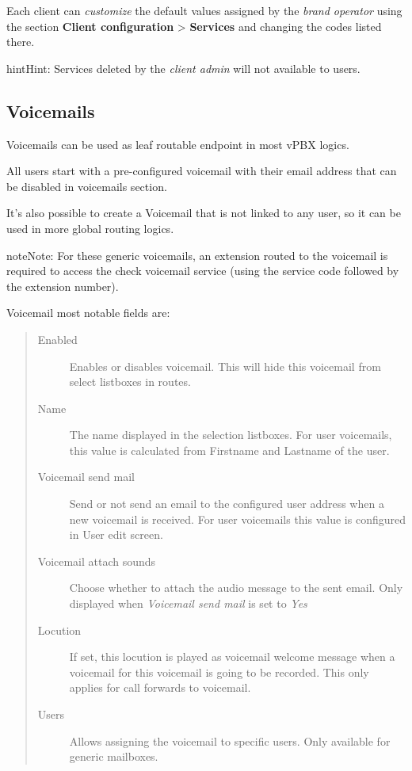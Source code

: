 \documentclass[letterpaper,10pt,english]{sphinxmanual}
\begin{document}
Each client can \emph{customize} the default values assigned by the \emph{brand operator}
using the section \textbf{Client configuration} \textgreater{} \textbf{Services} and changing the codes
listed there.

\begin{notice}{hint}{Hint:}
Services deleted by the \emph{client admin} will not available to users.
\end{notice}


\subsection{Voicemails}
\label{administration_portal/client/vpbx/voicemails:voicemails}\label{administration_portal/client/vpbx/voicemails::doc}\label{administration_portal/client/vpbx/voicemails:id1}
Voicemails can be used as leaf routable endpoint in most vPBX logics.

All users start with a pre-configured voicemail with their email address that can be disabled in voicemails section.

It's also possible to create a Voicemail that is not linked to any user, so it can be used in more global routing
logics.

\begin{notice}{note}{Note:}
For these generic voicemails, an extension routed to the voicemail is required to access the check voicemail
service (using the service code followed by the extension number).
\end{notice}

Voicemail most notable fields are:
\begin{quote}
\begin{description}
\item[{Enabled}] \leavevmode
Enables or disables voicemail. This will hide this voicemail from select listboxes in routes.

\item[{Name}] \leavevmode
The name displayed in the selection listboxes. For user voicemails, this value is calculated from Firstname and
Lastname of the user.

\item[{Voicemail send mail}] \leavevmode
Send or not send an email to the configured user address when a new voicemail is received. For user voicemails this value
is configured in User edit screen.

\item[{Voicemail attach sounds}] \leavevmode
Choose whether to attach the audio message to the sent email. Only displayed when \emph{Voicemail send mail} is set to \emph{Yes}

\item[{Locution}] \leavevmode
If set, this locution is played as voicemail welcome message when a voicemail
for this voicemail is going to be recorded. This only applies for call forwards
to voicemail.

\item[{Users}] \leavevmode
Allows assigning the voicemail to specific users. Only available for generic mailboxes.

\end{description}
\end{quote}
\end{document}
